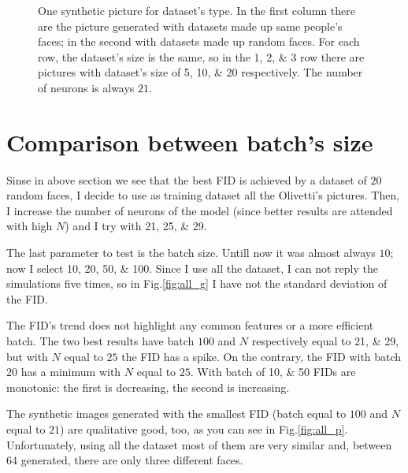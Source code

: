 \documentclass[a4paper,12pt]{article}
\begin{document}
\begin{figure}[p]
  \caption[Picture with different dataset's size]{One synthetic picture for dataset's type.
  In the first column there are the picture generated with datasets made up same people's faces; in the second with datasets made up random faces.
  For each row, the dataset's size is the same, so in the \numlist{1;2;3} row there are pictures with dataset's size of \numlist{5;10;20} respectively.
  The number of neurons is always $21$.
  }
  \label{fig:greg_p}
\end{figure}

\section{Comparison between batch's size}
Sinse in above section we see that the best FID is achieved by a dataset of $20$ random faces, I decide to use as training dataset all the Olivetti's pictures.
Then, I increase the number of neurons of the model (since better results are attended with high $N$) and I try with \numlist{21;25;29}.

The last parameter to test is the batch size.
Untill now it was almost always $10$; now I select \numlist{10;20;50;100}.
Since I use all the dataset, I can not reply the simulations five times, so in Fig.\ref{fig:all_g} I have not the standard deviation of the FID.

The FID's trend does not highlight any common features or a more efficient batch.
The two best results have batch $100$ and $N$ respectively equal to \numlist{21;29}, but with $N$ equal to $25$ the FID has a spike.
On the contrary, the FID with batch $20$ has a minimum with $N$ equal to $25$.
With batch of  \numlist{10;50} FIDs are monotonic: the first is decreasing, the second is increasing.

The synthetic images generated with the smallest FID (batch equal to $100$ and $N$ equal to $21$) are qualitative good, too, as you can see in Fig.\ref{fig:all_p}.
Unfortunately, using all the dataset most of them are very similar and, between $64$ generated, there are only three different faces.
\end{document}
